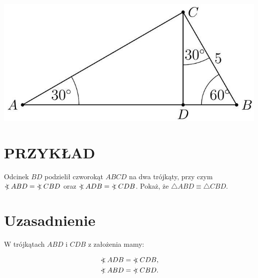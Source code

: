 \documentclass[10pt]{article}
\newcommand\Varangle{\mathop{{<\!\!\!\!\!\text{\small)}}\:}\nolimits}
\begin{document}
\includegraphics[max width=\textwidth, center]{2024_11_21_71f62bd117d375398909g-047}

\section*{PRZYKŁAD}
Odcinek \(B D\) podzielił czworokąt \(A B C D\) na dwa trójkąty, przy czym \(\Varangle A B D=\Varangle C B D\) oraz \(\Varangle A D B=\Varangle C D B\). Pokaż, że \(\triangle A B D \equiv \triangle C B D\).

\section*{Uzasadnienie}
W trójkątach \(A B D\) i \(C D B\) z założenia mamy:

\[
\begin{aligned}
& \Varangle A D B=\Varangle C D B, \\
& \Varangle A B D=\Varangle C B D .
\end{aligned}
\]
\end{document}
